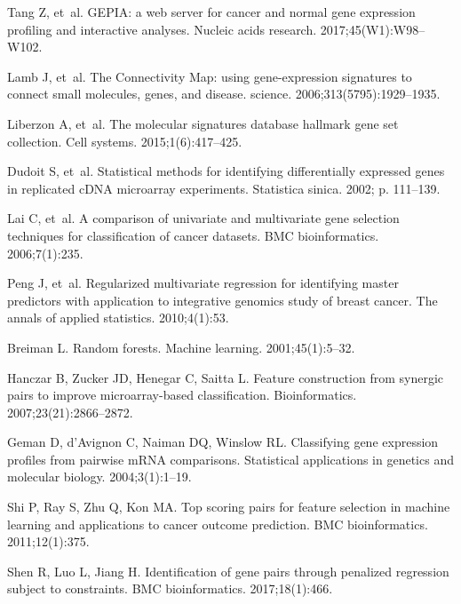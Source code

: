 \documentclass[10pt,letterpaper]{article}
\begin{document}
\begin{thebibliography}{10}

Tang Z, et~al.
\newblock GEPIA: a web server for cancer and normal gene expression profiling
  and interactive analyses.
\newblock Nucleic acids research. 2017;45(W1):W98--W102.

Lamb J, et~al.
\newblock The Connectivity Map: using gene-expression signatures to connect
  small molecules, genes, and disease.
\newblock science. 2006;313(5795):1929--1935.

Liberzon A, et~al.
\newblock The molecular signatures database hallmark gene set collection.
\newblock Cell systems. 2015;1(6):417--425.

Dudoit S, et~al.
\newblock Statistical methods for identifying differentially expressed genes in
  replicated cDNA microarray experiments.
\newblock Statistica sinica. 2002; p. 111--139.

Lai C, et~al.
\newblock A comparison of univariate and multivariate gene selection techniques
  for classification of cancer datasets.
\newblock BMC bioinformatics. 2006;7(1):235.

Peng J, et~al.
\newblock Regularized multivariate regression for identifying master predictors
  with application to integrative genomics study of breast cancer.
\newblock The annals of applied statistics. 2010;4(1):53.

Breiman L.
\newblock Random forests.
\newblock Machine learning. 2001;45(1):5--32.

Hanczar B, Zucker JD, Henegar C, Saitta L.
\newblock Feature construction from synergic pairs to improve microarray-based
  classification.
\newblock Bioinformatics. 2007;23(21):2866--2872.

Geman D, d'Avignon C, Naiman DQ, Winslow RL.
\newblock Classifying gene expression profiles from pairwise mRNA comparisons.
\newblock Statistical applications in genetics and molecular biology.
  2004;3(1):1--19.

Shi P, Ray S, Zhu Q, Kon MA.
\newblock Top scoring pairs for feature selection in machine learning and
  applications to cancer outcome prediction.
\newblock BMC bioinformatics. 2011;12(1):375.

Shen R, Luo L, Jiang H.
\newblock Identification of gene pairs through penalized regression subject to
  constraints.
\newblock BMC bioinformatics. 2017;18(1):466.


\end{thebibliography}
\end{document}
